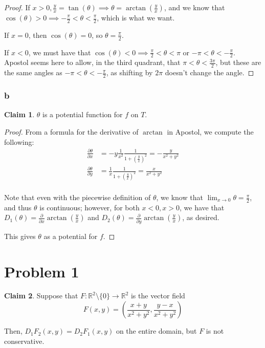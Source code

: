 \documentclass[12pt,letterpaper]{article}
\theoremstyle{definition}
\newtheorem*{claim}{Claim}
\newcommand{\R}{\mathbb{R}}
\begin{document}
\begin{proof}
  If $x > 0, \frac{y}{x} = \tan(\theta) \implies \theta = \arctan(\frac{y}{x})$, and we
  know that $\cos(\theta) > 0 \implies -\frac{\pi}{2} < \theta < \frac{\pi}{2}$,
  which is what we want.

  If $x = 0$, then $\cos(\theta) = 0$, so $\theta = \frac{\pi}{2}$.

  If $x < 0$, we must have that $\cos(\theta) < 0 \implies \frac{\pi}{2} <
  \theta < \pi$ or $-\pi < \theta < -\frac{\pi}{2}$. Apostol seems here to
  allow, in the third quadrant, that $\pi < \theta < \frac{3\pi}{2}$, but these
  are the same angles as $-\pi < \theta < -\frac{\pi}{2}$, as shifting by $2\pi$
  doesn't change the angle.
\end{proof}

\subsubsection*{b}

\begin{claim}
  $\theta$ is a potential function for $f$ on $T$.
\end{claim}

\begin{proof}
  From a formula for the derivative of $\arctan$ in Apostol, we compute the following:
  \begin{align*}
    \frac{\partial \theta}{\partial x} &= -y\frac{1}{x^2}\frac{1}{1 + (\frac{y}{x})^2} =- \frac{y}{x^2 + y^2} \\
    \frac{\partial \theta}{\partial y} &= \frac{1}{x}\frac{1}{1 + (\frac{y}{x})^2} = \frac{x}{x^2 + y^2} \\
  \end{align*}

  Note that even with the piecewise definition of $\theta$, we know that
  $\lim_{x\rightarrow 0}\theta = \frac{\pi}{2}$, and thus $\theta$ is
  continuous; however, for both $x < 0, x >0$, we have that $D_1(\theta) =
  \frac{\partial}{\partial x}\arctan(\frac{y}{x})$ and $D_2(\theta) =
  \frac{\partial}{\partial y}\arctan(\frac{y}{x})$, as desired.

  This gives $\theta$ as a potential for $f$.
\end{proof}


\section*{Problem 1}

\begin{claim}
  Suppose that $F: \R^2 \setminus \{0\} \rightarrow \R^2$ is the vector field
  \[
    F(x,y) = \left( \frac{x+y}{x^2+y^2}, \frac{y-x}{x^2+y^2} \right)
  \]

  Then, $D_1F_2(x,y) = D_2F_1(x,y)$ on the entire domain, but $F$ is not conservative.
\end{claim}
\end{document}
